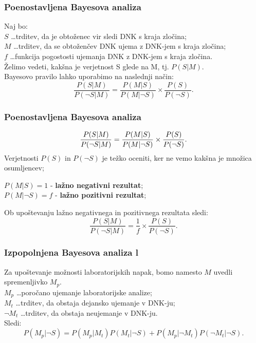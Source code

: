 \documentclass{beamer}
\begin{document}
\begin{frame}
    \frametitle{Poenostavljena Bayesova analiza}
    Naj bo:\\
    $S$ \dots trditev, da je obtoženec vir sledi DNK s kraja zločina; \\
    $M$ \dots trditev, da se obtoženčev DNK ujema z DNK-jem s kraja zločina; \\
    $f$ \dots funkcija pogostosti ujemanja DNK z DNK-jem s kraja zločina. \\
    Želimo vedeti, kakšna je verjetnost S glede na M, tj. $P(S \lvert M)$. \\ \vspace{3mm}
    Bayesovo pravilo lahko uporabimo na naslednji način:
    \[
        \frac{P(S \lvert M)}{P(\neg S \lvert M)} = \frac{P(M \lvert S)}{P(M \lvert \neg S)} \times \frac{P(S)}{P(\neg S)}.
    \] 
\end{frame} 

\begin{frame}
    \frametitle{Poenostavljena Bayesova analiza}
    \[
        \frac{P(S \lvert M)}{P(\neg S \lvert M)} = \frac{P(M \lvert S)}{P(M \lvert \neg S)} \times \frac{P(S)}{P(\neg S)}. \vspace{3mm}
    \] 
    Verjetnosti $P(S)$ in $P(\neg S)$ je težko oceniti, ker ne vemo kakšna je množica osumljencev;
    \begin{block}{}
        \centering
        $P(M \lvert S) = 1$ - \textbf{lažno negativni rezultat};\\ \vspace{2mm}
        $P(M \lvert \neg S) = f$ - \textbf{lažno pozitivni rezultat}; 
    \end{block}
  Ob upoštevanju lažno negativnega in pozitivnega rezultata sledi:
    \[
        \frac{P(S \lvert M)}{P(\neg S \lvert M)} = \frac{1}{f} \times \frac{P(S)}{P(\neg S)}.
    \]
\end{frame}

\begin{frame}
    \frametitle{Izpopolnjena Bayesova analiza l}
    Za upoštevanje možnosti laboratorijskih napak, bomo namesto $M$ uvedli spremenljivko $M_p$.\\ \vspace{3mm}
    $M_p$ \dots poročano ujemanje laboratorijske analize; \\ 
    $M_t$ \dots trditev, da obstaja dejansko ujemanje v DNK-ju;\\
    $\neg M_t$ \dots trditev, da obstaja neujemanje v DNK-ju.  \\ \vspace{3mm}
    Sledi:
    \[
        P(M_p \lvert \neg S) = P(M_p \lvert M_t)P(M_t \lvert \neg S) + P(M_p \lvert \neg M_t)P(\neg M_t \lvert \neg S). 
    \]
\end{frame}
\end{document}

